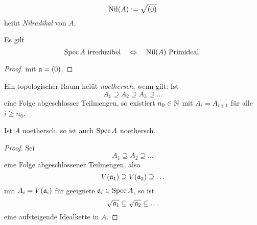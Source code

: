 \begin{definition}[Nilradikal]
	\[
		\operatorname{Nil}(A) := \sqrt{(0)}
	\]
	heiüt \emph{Nilradikal} von $A$.
\end{definition}

\begin{korollar}
	Es gilt
	\[
		\operatorname{Spec} A \text{ irreduzibel}
		\quad\Leftrightarrow\quad
		\operatorname{Nil}(A) \text{ Primideal}.
	\]
\end{korollar}
\begin{proof}
	 mit $\mathfrak{a} = (0)$.
\end{proof}

\begin{definition}[noethersch]
	Ein topologischer Raum heiüt \emph{noethersch}, wenn gilt:
	Ist 
	\[
		A_1 \supseteq A_2 \supseteq A_3 \supseteq\ldots
	\]
	eine Folge abgeschlosser Teilmengen, so existiert
	$n_0\in \mathbb{N}$ mit $A_i = A_{i+1}$ für alle $i\geq n_0$. 
\end{definition}

\begin{lemma}
	\label{lemma:A noethersch => Spec A noethersch}
	Ist $A$ noethersch, so ist auch $\operatorname{Spec} A$ noethersch.
\end{lemma}
\begin{proof}
	Sei 
	\[
		A_1 \supseteq A_2 \supseteq \ldots
	\]
	eine Folge abgeschlossener Teilmengen, also
	\[
		V(\mathfrak{a}_1) \supseteq V(\mathfrak{a}_2) \supseteq \ldots
	\]
	mit $A_i = V(\mathfrak{a}_i)$ für geeignete $\mathfrak{a}_i \in \operatorname{Spec} A$, so ist
	\[
		\sqrt{\mathfrak{a}_1} \subseteq \sqrt{\mathfrak{a}_2} \subseteq \ldots
	\]
	eine aufsteigende Idealkette in $A$.
\end{proof}

